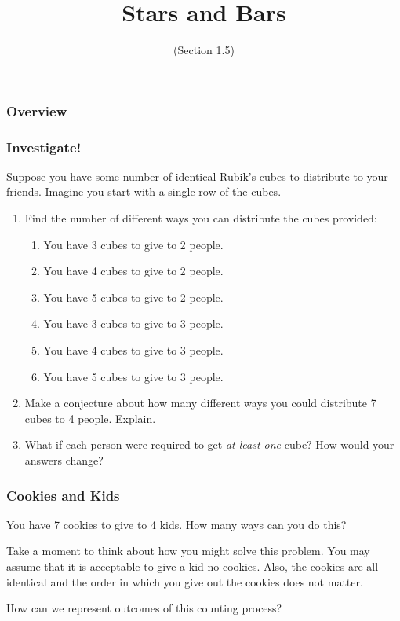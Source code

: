 \documentclass[11pt, compress]{beamer}
\title{Stars and Bars}
\subtitle{(Section 1.5)}
\author{}
\date[]{}
\begin{document}
\begin{frame}
\maketitle 
\end{frame}
 
\begin{frame}
\frametitle{Overview}
\tableofcontents 
\end{frame}
 
\begin{frame}
\frametitle{Investigate!}
 Suppose you have some number of identical Rubik's cubes to distribute to your friends. Imagine you start with a single row of the cubes.\begin{enumerate}
\item{} Find the number of different ways you can distribute the cubes provided:
\begin{enumerate}
\item{} You have 3 cubes to give to 2 people.


\item{} You have 4 cubes to give to 2 people.


\item{} You have 5 cubes to give to 2 people.


\item{} You have 3 cubes to give to 3 people.


\item{} You have 4 cubes to give to 3 people.


\item{} You have 5 cubes to give to 3 people.

\end{enumerate}



\item{} Make a conjecture about how many different ways you could distribute 7 cubes to 4 people. Explain.


\item{} What if each person were required to get \emph{at least one} cube? How would your answers change?

\end{enumerate}

\end{frame}
 
\begin{frame}
\frametitle{Cookies and Kids}
 You have 7 cookies to give to 4 kids. How many ways can you do this?
 
\pause \vfill 

Take a moment to think about how you might solve this problem. You may assume that it is acceptable to give a kid no cookies. Also, the cookies are all identical and the order in which you give out the cookies does not matter.
 
\pause \vfill 

How can we represent outcomes of this counting process?
\end{frame}
 
\end{document}
